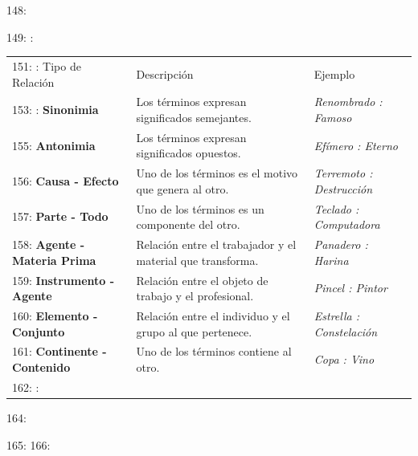 \documentclass[a4paper,12pt]{ctexart}
\begin{document}
148: \begin{table}[htbp]
149: : \begin{tabular}{l p{8cm} l}
151: \toprule
152: Tipo de Relación & Descripción & Ejemplo \\
153: \midrule
154: \textbf{Sinonimia} & Los términos expresan significados semejantes. & \textit{Renombrado : Famoso} \\
155: \textbf{Antonimia} & Los términos expresan significados opuestos. & \textit{Efímero : Eterno} \\
156: \textbf{Causa - Efecto} & Uno de los términos es el motivo que genera al otro. & \textit{Terremoto : Destrucción} \\
157: \textbf{Parte - Todo} & Uno de los términos es un componente del otro. & \textit{Teclado : Computadora} \\
158: \textbf{Agente - Materia Prima} & Relación entre el trabajador y el material que transforma. & \textit{Panadero : Harina} \\
159: \textbf{Instrumento - Agente} & Relación entre el objeto de trabajo y el profesional. & \textit{Pincel : Pintor} \\
160: \textbf{Elemento - Conjunto} & Relación entre el individuo y el grupo al que pertenece. & \textit{Estrella : Constelación} \\
161: \textbf{Continente - Contenido} & Uno de los términos contiene al otro. & \textit{Copa : Vino} \\
162: \bottomrule
163: \end{tabular}
164: \end{table}
165: 
166: 
\end{document}
